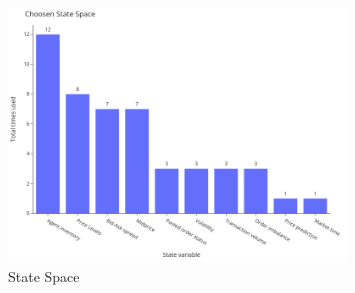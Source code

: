 \begin{figure}[H]
    \centering
    \includegraphics[width=0.8\textwidth]{images/state_space}
    \caption{State Space}
    \label{fig:state-space}
\end{figure}